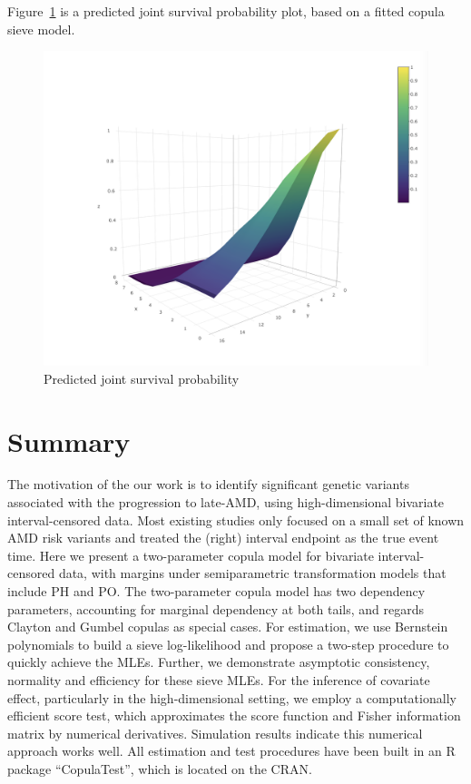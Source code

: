  Figure~\ref{figure:3D} is a predicted joint survival probability plot, based on a fitted copula sieve model.
\begin{figure}[htbp]
  \centering
  \includegraphics[scale=0.3]{3D.png}
   \caption{Predicted joint survival probability}
  \label{figure:3D}
\end{figure}

\section{Summary}
The motivation of the our work is to identify significant genetic variants associated with the progression to late-AMD, using high-dimensional bivariate interval-censored data. Most existing studies only focused on a small set of known AMD risk variants and treated the (right) interval endpoint as the true event time. Here we present a two-parameter copula model for bivariate interval-censored data, with margins under semiparametric transformation models that include PH and PO. The two-parameter copula model has two dependency parameters, accounting for marginal dependency at both tails, and regards Clayton and Gumbel copulas as special cases. For estimation, we use Bernstein polynomials to build a sieve log-likelihood and propose a two-step procedure to quickly achieve the MLEs. Further, we demonstrate asymptotic consistency, normality and efficiency for these sieve MLEs. For the inference of covariate effect, particularly in the high-dimensional setting, we employ a computationally efficient score test, which approximates the score function and Fisher information matrix by numerical derivatives. Simulation results indicate this numerical approach works well. All estimation and test procedures have been built in an R package ``CopulaTest'', which is located on the CRAN.

